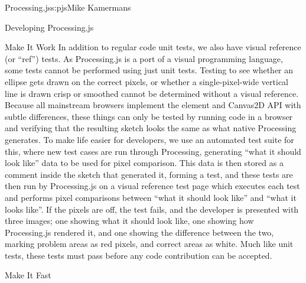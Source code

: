 \begin{aosachapter}{Processing.js}{s:pjs}{Mike Kamermans}
\begin{aosasect1}{Developing Processing.js}
\begin{aosasect2}{Make It Work}
In addition to regular code unit tests, we also have visual reference
(or ``ref'') tests. As Processing.js is a port of a visual programming
language, some tests cannot be performed using just unit
tests. Testing to see whether an ellipse gets drawn on the correct
pixels, or whether a single-pixel-wide vertical line is drawn crisp or
smoothed cannot be determined without a visual reference. Because all
mainstream browsers implement the
 element and Canvas2D API with
subtle differences, these things can only be tested by running code in
a browser and verifying that the resulting sketch looks the same as
what native Processing generates. To make life easier for developers,
we use an automated test suite for this, where new test cases are run
through Processing, generating ``what it should look like'' data to be
used for pixel comparison. This data is then stored as a comment
inside the sketch that generated it, forming a test, and these tests
are then run by Processing.js on a visual reference test page which
executes each test and performs pixel comparisons between ``what it
should look like'' and ``what it looks like''. If the pixels are off, the
test fails, and the developer is presented with three images; one
showing what it should look like, one showing how Processing.js
rendered it, and one showing the difference between the two, marking
problem areas as red pixels, and correct areas as white. Much like
unit tests, these tests must pass before any code contribution can be
accepted.

\end{aosasect2}

\begin{aosasect2}{Make It Fast}


\end{aosasect2}
\end{aosasect1}
\end{aosachapter}
